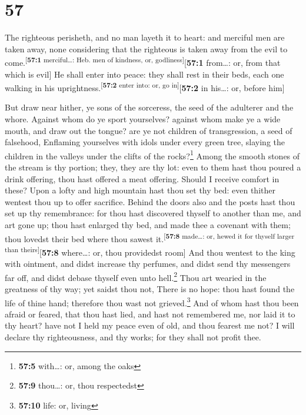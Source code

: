 \hypertarget{section-56}{%
\section{57}\label{section-56}}

 The righteous perisheth, and no man layeth it to heart:
and merciful men are taken away, none considering that the righteous is
taken away from the evil to come.\textsuperscript{{[}\textbf{57:1}
merciful\ldots: Heb. men of kindness, or, godliness{]}}{[}\textbf{57:1}
from\ldots: or, from that which is evil{]}  He shall enter
into peace: they shall rest in their beds, each one walking in his
uprightness.\textsuperscript{{[}\textbf{57:2} enter into: or, go
in{]}}{[}\textbf{57:2} in his\ldots: or, before him{]}

 But draw near hither, ye sons of the sorceress, the seed
of the adulterer and the whore.  Against whom do ye sport
yourselves? against whom make ye a wide mouth, and draw out the tongue?
are ye not children of transgression, a seed of falsehood,
 Enflaming yourselves with idols under every green tree,
slaying the children in the valleys under the clifts of the
rocks?\footnote{\textbf{57:5} with\ldots: or, among the oaks}
 Among the smooth stones of the stream is thy portion;
they, they are thy lot: even to them hast thou poured a drink offering,
thou hast offered a meat offering. Should I receive comfort in these?
 Upon a lofty and high mountain hast thou set thy bed:
even thither wentest thou up to offer sacrifice.  Behind
the doors also and the posts hast thou set up thy remembrance: for thou
hast discovered thyself to another than me, and art gone up; thou hast
enlarged thy bed, and made thee a covenant with them; thou lovedst their
bed where thou sawest it.\textsuperscript{{[}\textbf{57:8} made\ldots:
or, hewed it for thyself larger than theirs{]}}{[}\textbf{57:8}
where\ldots: or, thou providedst room{]}  And thou wentest
to the king with ointment, and didst increase thy perfumes, and didst
send thy messengers far off, and didst debase thyself even unto
hell.\footnote{\textbf{57:9} thou\ldots: or, thou respectedst}
 Thou art wearied in the greatness of thy way; yet saidst
thou not, There is no hope: thou hast found the life of thine hand;
therefore thou wast not grieved.\footnote{\textbf{57:10} life: or,
  living}  And of whom hast thou been afraid or feared,
that thou hast lied, and hast not remembered me, nor laid it to thy
heart? have not I held my peace even of old, and thou fearest me not?
 I will declare thy righteousness, and thy works; for
they shall not profit thee.


